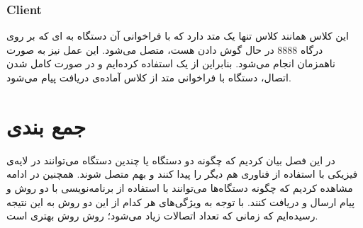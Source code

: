 \subsubsection{Client}
این کلاس همانند کلاس 
تنها یک متد
 دارد که با فراخوانی آن دستگاه به 
ای که بر روی درگاه 8888 در حال گوش دادن هست، متصل می‌شود. این عمل نیز به صورت ناهمزمان انجام می‌شود. بنابراین از یک
استفاده کرده‌ایم و در صورت کامل شدن اتصال، دستگاه با فراخوانی متد
از کلاس 
آماده‌ی دریافت پیام می‌شود.

\section{جمع بندی}
در این فصل بیان کردیم که چگونه دو دستگاه یا چندین دستگاه می‌توانند در لایه‌ی فیزیکی با استفاده از فناوری 
هم دیگر را پیدا کنند و بهم متصل شوند.
همچنین در ادامه مشاهده کردیم که چگونه دستگاه‌ها می‌توانند با استفاده از برنامه‌نویسی
 با دو روش 
 و
 پیام ارسال و دریافت کنند. با توجه به ویژگی‌های هر کدام از این دو روش به این نتیجه رسیده‌ایم که زمانی که تعداد اتصالات زیاد می‌شود؛ روش 
 روش بهتری است.






